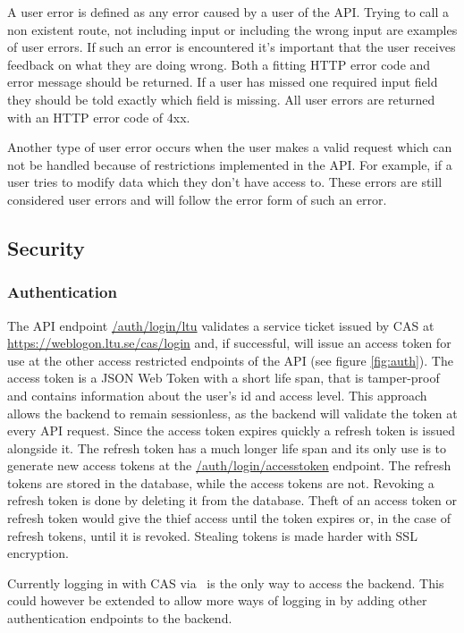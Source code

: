A user error is defined as any error caused by a user of the API. Trying to call a non existent route, not including input or including the wrong input are examples of user errors. If such an error is encountered it's important that the user receives feedback on what they are doing wrong. Both a fitting HTTP error code and error message should be returned. If a user has missed one required input field they should be told exactly which field is missing. All user errors are returned with an HTTP error code of 4xx.

Another type of user error occurs when the user makes a valid request which can not be handled because of restrictions implemented in the API. For example, if a user tries to modify data which they don't have access to. These errors are still considered user errors and will follow the error form of such an error.

\subsection{Security}

\subsubsection{Authentication}
The API endpoint \url{/auth/login/ltu} validates a service ticket issued by CAS at \url{https://weblogon.ltu.se/cas/login} and, if successful, will issue an access token for use at the other access restricted endpoints of the API (see figure \ref{fig:auth}). The access token is a JSON Web Token with a short life span, that is tamper-proof and contains information about the user's id and access level. This approach allows the backend to remain sessionless, as the backend will validate the token at every API request. Since the access token expires quickly a refresh token is issued alongside it. The refresh token has a much longer life span and its only use is to generate new access tokens at the \url{/auth/login/accesstoken} endpoint. The refresh tokens are stored in the database, while the access tokens are not. Revoking a refresh token is done by deleting it from the database. Theft of an access token or refresh token would give the thief access until the token expires or, in the case of refresh tokens, until it is revoked. Stealing tokens is made harder with SSL encryption.

Currently logging in with CAS via \LTU\ is the only way to access the backend. This could however be extended to allow more ways of logging in by adding other authentication endpoints to the backend.

